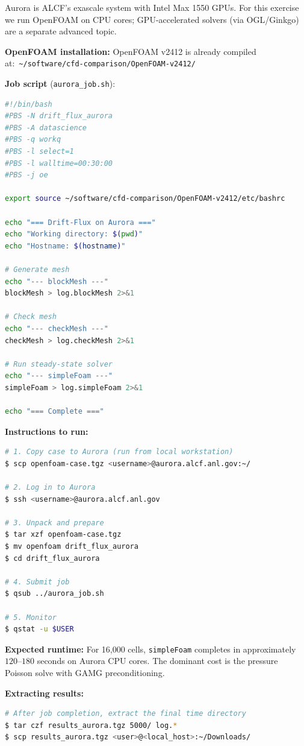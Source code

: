 \documentclass[12pt]{article}
\begin{document}
Aurora is ALCF's exascale system with Intel Max 1550 GPUs. For this exercise we run OpenFOAM on CPU cores; GPU-accelerated solvers (via OGL/Ginkgo) are a separate advanced topic.

\textbf{OpenFOAM installation:} OpenFOAM v2412 is already compiled at:\
\texttt{\textasciitilde/software/cfd-comparison/OpenFOAM-v2412/}

\textbf{Job script} (\texttt{aurora\_job.sh}):

\begin{lstlisting}[language=bash]
#!/bin/bash
#PBS -N drift_flux_aurora
#PBS -A datascience
#PBS -q workq
#PBS -l select=1
#PBS -l walltime=00:30:00
#PBS -j oe

export source ~/software/cfd-comparison/OpenFOAM-v2412/etc/bashrc

echo "=== Drift-Flux on Aurora ==="
echo "Working directory: $(pwd)"
echo "Hostname: $(hostname)"

# Generate mesh
echo "--- blockMesh ---"
blockMesh > log.blockMesh 2>&1

# Check mesh
echo "--- checkMesh ---"
checkMesh > log.checkMesh 2>&1

# Run steady-state solver
echo "--- simpleFoam ---"
simpleFoam > log.simpleFoam 2>&1

echo "=== Complete ==="
\end{lstlisting}

\textbf{Instructions to run:}
\begin{lstlisting}[language=bash, basicstyle=\ttfamily\small]
# 1. Copy case to Aurora (run from local workstation)
$ scp openfoam-case.tgz <username>@aurora.alcf.anl.gov:~/

# 2. Log in to Aurora
$ ssh <username>@aurora.alcf.anl.gov

# 3. Unpack and prepare
$ tar xzf openfoam-case.tgz
$ mv openfoam drift_flux_aurora
$ cd drift_flux_aurora

# 4. Submit job
$ qsub ../aurora_job.sh

# 5. Monitor
$ qstat -u $USER
\end{lstlisting}

\textbf{Expected runtime:} For 16,000 cells, \texttt{simpleFoam} completes in approximately $120$--$180$ seconds on Aurora CPU cores. The dominant cost is the pressure Poisson solve with GAMG preconditioning.

\textbf{Extracting results:}
\begin{lstlisting}[language=bash]
# After job completion, extract the final time directory
$ tar czf results_aurora.tgz 5000/ log.*
$ scp results_aurora.tgz <user>@<local_host>:~/Downloads/
\end{lstlisting}
\end{document}

